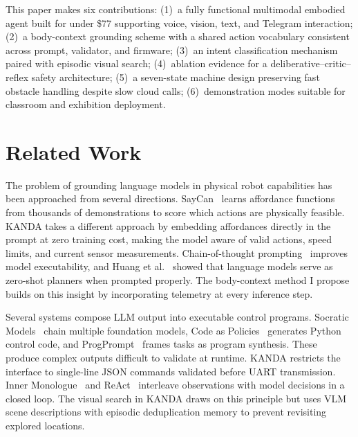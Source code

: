 \documentclass[conference]{IEEEtran}
\begin{document}
This paper makes six contributions: (1)~a fully functional multimodal embodied agent built for under \$77 supporting voice, vision, text, and Telegram interaction; (2)~a body-context grounding scheme with a shared action vocabulary consistent across prompt, validator, and firmware; (3)~an intent classification mechanism paired with episodic visual search; (4)~ablation evidence for a deliberative--critic--reflex safety architecture; (5)~a seven-state machine design preserving fast obstacle handling despite slow cloud calls; (6)~demonstration modes suitable for classroom and exhibition deployment.

\section{Related Work}
\label{sec:related}

The problem of grounding language models in physical robot capabilities has been approached from several directions. SayCan~\cite{ahn2022saycan} learns affordance functions from thousands of demonstrations to score which actions are physically feasible. KANDA takes a different approach by embedding affordances directly in the prompt at zero training cost, making the model aware of valid actions, speed limits, and current sensor measurements. Chain-of-thought prompting~\cite{wei2022cot} improves model executability, and Huang et al.~\cite{huang2022zeroshot} showed that language models serve as zero-shot planners when prompted properly. The body-context method I propose builds on this insight by incorporating telemetry at every inference step.

Several systems compose LLM output into executable control programs. Socratic Models~\cite{zeng2023socratic} chain multiple foundation models, Code as Policies~\cite{liang2023code} generates Python control code, and ProgPrompt~\cite{singh2023progprompt} frames tasks as program synthesis. These produce complex outputs difficult to validate at runtime. KANDA restricts the interface to single-line JSON commands validated before UART transmission. Inner Monologue~\cite{huang2022innermonologue} and ReAct~\cite{yao2023react} interleave observations with model decisions in a closed loop. The visual search in KANDA draws on this principle but uses VLM scene descriptions with episodic deduplication memory to prevent revisiting explored locations.
\end{document}
